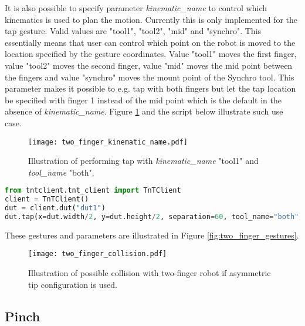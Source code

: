 It is also possible to specify parameter \emph{kinematic\_name} to control which kinematics is used to plan the motion. Currently this is only implemented for the tap gesture. Valid values are "tool1", "tool2", "mid" and "synchro". This essentially means that user can control which point on the robot is moved to the location specified by the gesture coordinates. Value "tool1" moves the first finger, value "tool2" moves the second finger, value "mid" moves the mid point between the fingers and value "synchro" moves the mount point of the Synchro tool. This parameter makes it possible to e.g. tap with both fingers but let the tap location be specified with finger 1 instead of the mid point which is the default in the absence of \emph{kinematic\_name}. Figure \ref{fig:two_finger_kinematic_name} and the script below illustrate such use case.

\begin{figure}[!h]
	\centering
	\texttt{[image: two\_finger\_kinematic\_name.pdf]}
	\caption{Illustration of performing tap with \emph{kinematic\_name} "tool1" and \emph{tool\_name} "both".}
	\label{fig:two_finger_kinematic_name}
\end{figure}

\begin{lstlisting}[language=Python]
from tntclient.tnt_client import TnTClient
client = TnTClient()
dut = client.dut("dut1")
dut.tap(x=dut.width/2, y=dut.height/2, separation=60, tool_name="both", kinematic_name="tool1")
\end{lstlisting}

These gestures and parameters are illustrated in Figure \ref{fig:two_finger_gestures}.


\begin{figure}[!h]
	\centering
	\texttt{[image: two\_finger\_collision.pdf]}
	\caption{Illustration of possible collision with two-finger robot if asymmetric tip configuration is used.}
	\label{fig:two_finger_collision}
\end{figure}

\subsection{Pinch}

